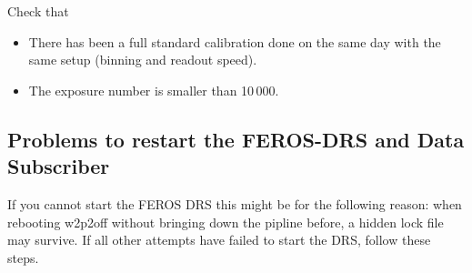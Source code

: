 \documentclass[11pt,fleqn]{book}
\begin{document}
Check that
\begin{itemize}
    \item There has been a full standard calibration done on the same day with the same setup (binning and readout speed).
    \item The exposure number is smaller than 10\,000.
\end{itemize}

\subsection{Problems to restart the FEROS-DRS and Data Subscriber}


If you cannot start the FEROS DRS this might be for the following reason: when rebooting w2p2off without bringing down the pipline before, a hidden lock file may survive. If all other attempts have failed to start the DRS, follow these steps.
\end{document}
